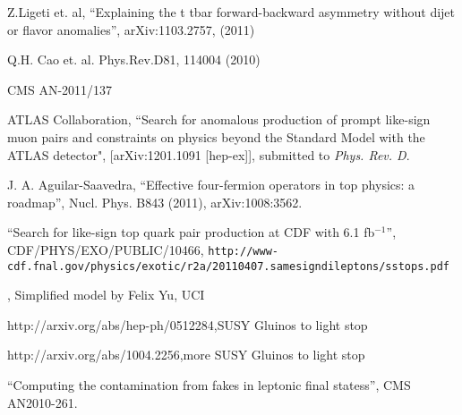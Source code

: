 \begin{thebibliography}{99}
 {Z.Ligeti et. al, ``Explaining the t tbar forward-backward asymmetry without dijet or flavor anomalies'', arXiv:1103.2757, (2011)}



 {Q.H. Cao et. al. Phys.Rev.D81, 114004 (2010)}

 {CMS AN-2011/137}

 ATLAS Collaboration, 
``Search for anomalous production of prompt like-sign muon 
pairs and constraints on physics beyond the Standard Model
with the ATLAS detector",   [arXiv:1201.1091 [hep-ex]], submitted to 
\textit{Phys. Rev. D}.

 {J. A. Aguilar-Saavedra, 
 ``Effective four-fermion operators in top physics: a roadmap'', 
 Nucl. Phys. B843 (2011), arXiv:1008:3562.}

 {``Search for like-sign top quark pair production at CDF with 6.1 fb$^{-1}$''}, CDF/PHYS/EXO/PUBLIC/10466, 
{\tt http://www-cdf.fnal.gov/physics/exotic/r2a/20110407.samesigndileptons/sstops.pdf}

,{ Simplified model by Felix Yu, UCI}

 { http://arxiv.org/abs/hep-ph/0512284},{SUSY Gluinos to light stop}

 { http://arxiv.org/abs/1004.2256},{more SUSY Gluinos to light stop}

 ``Computing the contamination from fakes in leptonic 
final statess'',  CMS AN2010-261.




\end{thebibliography}







